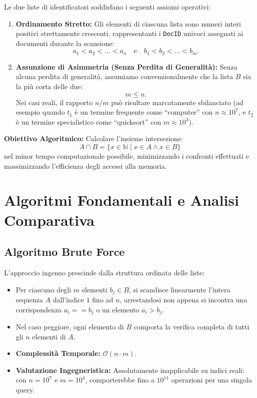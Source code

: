 \begin{property}
Le due liste di identificatori soddisfano i seguenti assiomi operativi:
\begin{enumerate}
  \item \textbf{Ordinamento Stretto:} Gli elementi di ciascuna lista sono numeri interi positivi strettamente crescenti, rappresentanti i \texttt{DocID} univoci assegnati ai documenti durante la scansione:
  \begin{equation}
    a_1 < a_2 < \dots < a_n \quad \text{e} \quad b_1 < b_2 < \dots < b_m.
  \end{equation}
  \item \textbf{Assunzione di Asimmetria (Senza Perdita di Generalità):} Senza alcuna perdita di generalità, assumiamo convenzionalmente che la lista $B$ sia la più corta delle due:
  \begin{equation}
    m \le n.
  \end{equation}
  Nei casi reali, il rapporto $n/m$ può risultare marcatamente sbilanciato (ad esempio quando $t_1$ è un termine frequente come ``computer'' con $n \approx 10^7$, e $t_2$ è un termine specialistico come ``quicksort'' con $m \approx 10^3$).
\end{enumerate}
\end{property}

\textbf{Obiettivo Algoritmico:} Calcolare l'insieme intersezione:
\begin{equation}
  A \cap B = \{x \in \mathbb{N} \mid x \in A \land x \in B\}
\end{equation}
nel minor tempo computazionale possibile, minimizzando i confronti effettuati e massimizzando l'efficienza degli accessi alla memoria.

\FloatBarrier
\section{Algoritmi Fondamentali e Analisi Comparativa}
\label{sec:fundamental-intersection-algorithms}

\subsection{Algoritmo Brute Force}
L'approccio ingenuo prescinde dalla struttura ordinata delle liste:
\begin{itemize}
  \item Per ciascuno degli $m$ elementi $b_j \in B$, si scandisce linearmente l'intera sequenza $A$ dall'indice $1$ fino ad $n$, arrestandosi non appena si incontra una corrispondenza $a_i == b_j$ o un elemento $a_i > b_j$.
  \item Nel caso peggiore, ogni elemento di $B$ comporta la verifica completa di tutti gli $n$ elementi di $A$.
  \item \textbf{Complessità Temporale:} $\mathcal{O}(n \cdot m)$.
  \item \textbf{Valutazione Ingegneristica:} Assolutamente inapplicabile su indici reali: con $n = 10^7$ e $m = 10^4$, comporterebbe fino a $10^{11}$ operazioni per una singola query.
\end{itemize}

